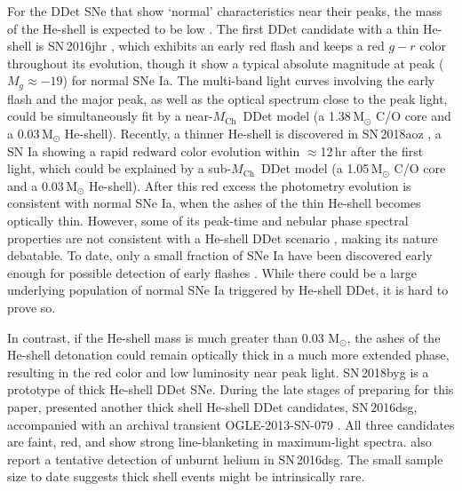 \documentclass[twocolumn]{aastex631}
\newcommand{\Mch}{$M_\mathrm{Ch}$}
\begin{document}
For the DDet SNe that show `normal' characteristics near their peaks, the mass of the He-shell is expected to be low \citep[$\lesssim$0.03\,$\mathrm{M_\odot}$;][]{Kromer_DD_2010,Sim_2010,Shen_DD_2018,polin_observational_2019}. The first DDet candidate with a thin He-shell is SN\,2016jhr \citep{jiang_16jhr_2017}, which exhibits an early red flash and keeps a red $g-r$ color throughout its evolution, though it show a typical absolute magnitude at peak ($M_g\approx-19$) for normal SNe Ia. The multi-band light curves involving the early flash and the major peak, as well as the optical spectrum close to the peak light, could be simultaneously fit by a near-\Mch\ DDet model (a 1.38\,$\mathrm{M_\odot}$ C/O core and a 0.03\,$\mathrm{M_\odot}$ He-shell). Recently, a thinner He-shell is discovered in SN\,2018aoz \citep{Ni_2022}, a SN Ia showing a rapid redward color evolution within $\approx$12\,hr after the first light, which could be explained by a sub-\Mch\ DDet model (a 1.05\,$\mathrm{M_\odot}$ C/O core and a 0.03\,$\mathrm{M_\odot}$ He-shell). After this red excess the photometry evolution is consistent with normal SNe Ia, when the ashes of the thin He-shell becomes optically thin. However, some of its peak-time and nebular phase spectral properties are not consistent with a He-shell DDet scenario \citep{Ni_2022b}, making its nature debatable. To date, only a small fraction of SNe Ia have been discovered early enough for possible detection of early flashes \citep[e.g.,][]{Deckers_2022}. While there could be a large underlying population of normal SNe Ia triggered by He-shell DDet, it is hard to prove so.

In contrast, if the He-shell mass is much greater than 0.03\,$\,\mathrm{M_\odot}$, the ashes of the He-shell detonation could remain optically thick in a much more extended phase, resulting in the red color and low luminosity near peak light. SN\,2018byg \citep{de_18byg_2019} is a prototype of thick He-shell DDet SNe. During the late stages of preparing for this paper, \citet{Dong_16dsg_2022} presented another thick shell He-shell DDet candidates, SN\,2016dsg, accompanied with an archival transient OGLE-2013-SN-079 \citep{Inserra_OGLE13_079_2015}. All three candidates are faint, red, and show strong line-blanketing in maximum-light spectra. \citet{Dong_16dsg_2022} also report a tentative detection of unburnt helium in SN\,2016dsg. The small sample size to date suggests thick shell events might be intrinsically rare.
\end{document}
